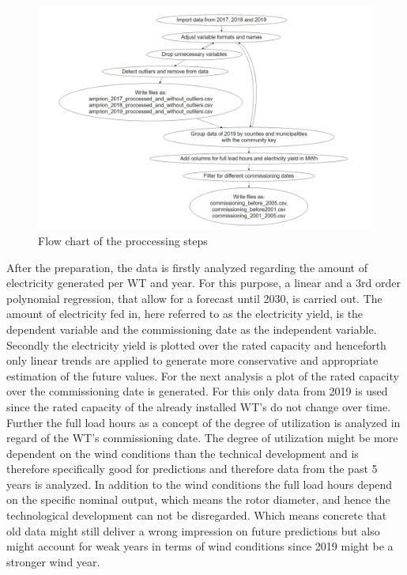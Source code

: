 \documentclass[a4paper,11pt]{article}
\begin{document}
\begin{figure}

{\centering \includegraphics[width=1\linewidth]{data/Amprion/results_of_preparation/flow} 

}

\caption{Flow chart of the proccessing steps}\label{fig:preparation}
\end{figure}
After the preparation, the data is firstly analyzed regarding the amount of electricity generated per WT and year. For this purpose, a linear and a 3rd order polynomial regression, that allow for a forecast until 2030, is carried out. The amount of electricity fed in, here referred to as the electricity yield, is the dependent variable and the commissioning date as the independent variable. Secondly the electricity yield is plotted over the rated capacity and henceforth only linear trends are applied to generate more conservative and appropriate estimation of the future values. For the next analysis a plot of the rated capacity over the commissioning date is generated. For this only data from 2019 is used since the rated capacity of the already installed WT's do not change over time. Further the full load hours as a concept of the degree of utilization is analyzed in regard of the WT's commissioning date. The degree of utilization might be more dependent on the wind conditions than the technical development and is therefore specifically good for predictions and therefore data from the past 5 years is analyzed. In addition to the wind conditions the full load hours depend on the specific nominal output, which means the rotor diameter, and hence the technological development can not be disregarded. Which means concrete that old data might still deliver a wrong impression on future predictions but also might account for weak years in terms of wind conditions since 2019 might be a stronger wind year.
\end{document}
